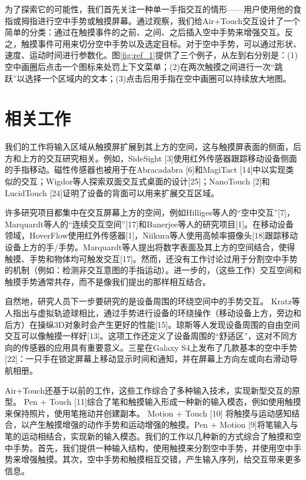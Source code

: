 为了探索它的可能性，我们首先关注一种单一手指交互的情形——用户使用他的食指或拇指进行空中手势或触摸屏幕。通过观察，我们给Air+Touch交互设计了一个简单的分类：通过在触摸事件的之前、之间、之后插入空中手势来增强交互。反之，触摸事件可用来切分空中手势以及选定目标。对于空中手势，可以通过形状、速度、运动时间进行参数化。图\ref{fig:ref_1}提供了三个例子，从左到右分别是：(1)空中画圈后点击一个图标来处罚上下文菜单；(2)在两次触摸之间进行一次“跳跃”以选择一个区域内的文本；(3)点击后用手指在空中画圈可以持续放大地图。

\section{相关工作}

我们的工作将输入区域从触摸屏扩展到其上方的空间，这与触摸屏表面的侧面，后方和上方的交互研究相关。例如，SideSight [3]使用红外传感器跟踪移动设备侧面的手指移动。磁性传感器也被用于在Abracadabra [6]和MagiTact [14]中以实现类似的交互；Wigdor等人探索双面交互式桌面的设计[25]；NanoTouch [2]和LucidTouch [24]证明了设备的背面可以用来扩展交互区域。

许多研究项目都集中在交互屏幕上方的空间，例如Hilliges等人的“空中交互”[7]，Marquardt等人的“连续交互空间”[17]和Banerjee等人的研究项目[1]。在移动设备领域，HoverFlow使用红外传感器[1]，Niikura等人使用高帧率摄像头[18]跟踪移动设备上方的手/手势。Marquardt等人提出将数字表面及其上方的空间结合，使得触摸、手势和物体均可触发交互[17]。然而，还没有工作讨论过用于分割空中手势的机制（例如：检测非交互意图的手指运动）。进一步的，（这些工作）交互空间和触摸手势通常共存，而不是像我们提出的那样相互结合。

自然地，研究人员下一步要研究的是设备周围的环绕空间中的手势交互。 Kratz等人指出与虚拟轨迹球相比，通过手势进行设备的环绕操作（移动设备上方，旁边和后方）在操纵3D对象时会产生更好的性能[15]。琼斯等人发现设备周围的自由空间交互可以像触摸一样好[13]。这项工作还定义了设备周围的“舒适区”，这对不同方向的传感器的应用具有重要意义。三星在Galaxy S4上发布了几款基本的空中手势[22]：一只手在锁定屏幕上移动显示时间和通知，并在屏幕上方向左或向右滑动导航相册。 

Air+Touch还基于以前的工作，这些工作综合了多种输入技术，实现新型交互的原型。 Pen + Touch [11]综合了笔和触摸输入形成一种新的输入模态，例如使用触摸来保持照片，使用笔拖动并创建副本。 Motion + Touch [10] 将触摸与运动感知结合，以产生触摸增强的动作手势和运动增强的触摸。Pen + Motion [9]将笔输入与笔的运动相结合，实现新的输入模态。我们的工作以几种新的方式综合了触摸和空中手势。首先，我们提供一种输入结构，使用触摸来分割空中手势，并使用空中手势来增强触摸。其次，空中手势和触摸相互交错，产生输入序列，给交互带来更多信息。

